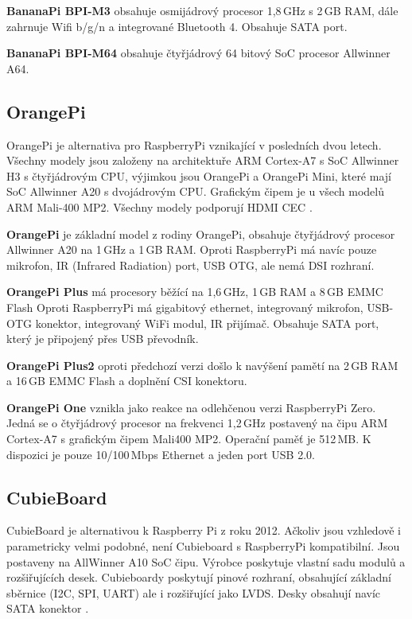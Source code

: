 	\textbf{BananaPi BPI-M3} obsahuje osmijádrový procesor 1,8\,GHz s 2\,GB RAM, dále zahrnuje Wifi b/g/n a integrované Bluetooth 4. Obsahuje SATA port.
	
	\textbf{BananaPi BPI-M64} obsahuje čtyřjádrový 64 bitový SoC procesor Allwinner A64.

	\subsection{OrangePi}
	OrangePi je alternativa pro RaspberryPi vznikající v posledních dvou letech. Všechny modely jsou založeny na architektuře ARM Cortex-A7 s SoC Allwinner H3 s čtyřjádrovým CPU, výjimkou jsou OrangePi a OrangePi Mini, které mají SoC Allwinner A20 s dvojádrovým CPU. Grafickým čipem je u všech modelů ARM Mali-400 MP2. Všechny modely podporují HDMI CEC \cite{OrangePi}.

		\textbf{OrangePi} je základní model z rodiny OrangePi, obsahuje čtyřjádrový procesor Allwinner A20 na 1\,GHz a 1\,GB RAM. Oproti RaspberryPi má navíc pouze mikrofon, IR (Infrared Radiation) port, USB OTG, ale nemá DSI rozhraní.
		
		\textbf{OrangePi Plus } má procesory běžící na 1,6\,GHz, 1\,GB RAM a 8\,GB EMMC Flash Oproti  RaspberryPi má gigabitový ethernet, integrovaný mikrofon, USB-OTG konektor, integrovaný WiFi modul, IR přijímač. Obsahuje SATA port, který je připojený přes USB převodník.
		
		\textbf{OrangePi Plus2} oproti předchozí verzi došlo k navýšení pamětí na 2\,GB RAM a 16\,GB EMMC Flash a doplnění CSI konektoru.
		
		\textbf{OrangePi One} vznikla jako reakce na odlehčenou verzi RaspberryPi Zero. Jedná se o čtyřjádrový procesor na frekvenci 1,2\,GHz postavený na čipu ARM Cortex-A7 s grafickým čipem Mali400 MP2. Operační paměť je 512\,MB. K dispozici je pouze 10/100\,Mbps Ethernet a jeden port USB 2.0.


	\subsection{CubieBoard}
	\label{KapCubie}
			CubieBoard je alternativou k Raspberry Pi z roku 2012. Ačkoliv jsou vzhledově i parametricky velmi podobné, není Cubieboard s RaspberryPi kompatibilní. Jsou postaveny na AllWinner A10 SoC čipu. Výrobce poskytuje vlastní sadu modulů a rozšiřujících desek. Cubieboardy poskytují pinové rozhraní, obsahující základní sběrnice (I2C, SPI, UART) ale i rozšiřující jako LVDS. Desky obsahují navíc SATA konektor \cite{CubieBoards}.
	
